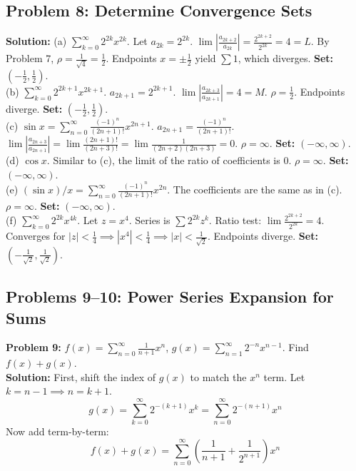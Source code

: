 \documentclass[11pt, letterpaper]{article}
\theoremstyle{definition}
\theoremstyle{remark}
\begin{document}
\subsection{Problem 8: Determine Convergence Sets}
\textbf{Solution:}
(a) $\sum_{k=0}^{\infty} 2^{2k} x^{2k}$. Let $a_{2k} = 2^{2k}$. $\lim \left| \frac{a_{2k+2}}{a_{2k}} \right| = \frac{2^{2k+2}}{2^{2k}} = 4 = L$. By Problem 7, $\rho = \frac{1}{\sqrt{4}} = \frac{1}{2}$. Endpoints $x = \pm \frac{1}{2}$ yield $\sum 1$, which diverges. \textbf{Set:} $(-\frac{1}{2}, \frac{1}{2})$.
\\[4pt]
(b) $\sum_{k=0}^{\infty} 2^{2k+1} x^{2k+1}$. $a_{2k+1} = 2^{2k+1}$. $\lim \left| \frac{a_{2k+3}}{a_{2k+1}} \right| = 4 = M$. $\rho = \frac{1}{2}$. Endpoints diverge. \textbf{Set:} $(-\frac{1}{2}, \frac{1}{2})$.
\\[4pt]
(c) $\sin x = \sum_{n=0}^{\infty} \frac{(-1)^n}{(2n+1)!} x^{2n+1}$. $a_{2n+1} = \frac{(-1)^n}{(2n+1)!}$. $\lim \left| \frac{a_{2n+3}}{a_{2n+1}} \right| = \lim \frac{(2n+1)!}{(2n+3)!} = \lim \frac{1}{(2n+2)(2n+3)} = 0$. $\rho = \infty$. \textbf{Set:} $(-\infty, \infty)$.
\\[4pt]
(d) $\cos x$. Similar to (c), the limit of the ratio of coefficients is 0. $\rho = \infty$. \textbf{Set:} $(-\infty, \infty)$.
\\[4pt]
(e) $(\sin x)/x = \sum_{n=0}^{\infty} \frac{(-1)^n}{(2n+1)!} x^{2n}$. The coefficients are the same as in (c). $\rho = \infty$. \textbf{Set:} $(-\infty, \infty)$.
\\[4pt]
(f) $\sum_{k=0}^{\infty} 2^{2k} x^{4k}$. Let $z = x^4$. Series is $\sum 2^{2k} z^k$. Ratio test: $\lim \frac{2^{2k+2}}{2^{2k}} = 4$. Converges for $|z| < \frac{1}{4} \implies |x^4| < \frac{1}{4} \implies |x| < \frac{1}{\sqrt{2}}$. Endpoints diverge. \textbf{Set:} $(-\frac{1}{\sqrt{2}}, \frac{1}{\sqrt{2}})$.

\subsection{Problems 9--10: Power Series Expansion for Sums}
\textbf{Problem 9:} $f(x) = \sum_{n=0}^{\infty} \frac{1}{n+1} x^n$, $g(x) = \sum_{n=1}^{\infty} 2^{-n} x^{n-1}$. Find $f(x) + g(x)$.
\\[6pt]
\textbf{Solution:} First, shift the index of $g(x)$ to match the $x^n$ term. Let $k = n-1 \implies n = k+1$.
\[ g(x) = \sum_{k=0}^{\infty} 2^{-(k+1)} x^k = \sum_{n=0}^{\infty} 2^{-(n+1)} x^n \]
Now add term-by-term:
\[ f(x) + g(x) = \sum_{n=0}^{\infty} \left( \frac{1}{n+1} + \frac{1}{2^{n+1}} \right) x^n \]
\end{document}
